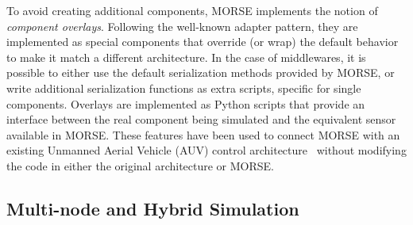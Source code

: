 \documentclass{llncs}
\begin{document}
To avoid creating additional components,
MORSE implements the notion of \emph{component overlays}. Following
the well-known adapter pattern, they are implemented as
special components that override (or wrap) the default
behavior to make it match a different architecture.
In the case of middlewares, it is possible to either use the default
serialization methods provided by MORSE, or write additional serialization
functions as extra scripts, specific for single components.
Overlays are implemented as Python scripts that provide an interface between
the real component being simulated and the equivalent sensor available in
MORSE.
These features have been used to connect MORSE with an existing
Unmanned Aerial Vehicle (AUV) control architecture~\cite{barbier2011}
without modifying the code in either the original architecture or MORSE.


\subsection{Multi-node and Hybrid Simulation}
\label{section:multinode}
\end{document}

